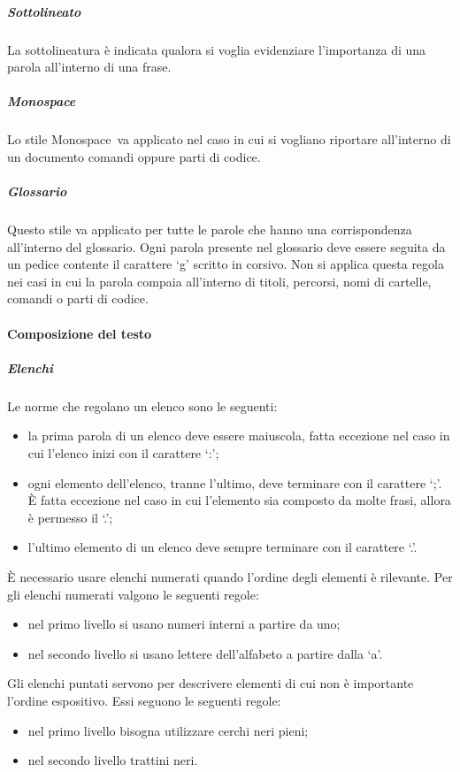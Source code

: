 \documentclass[../NormeProgetto.tex]{subfiles}
\begin{document}
			\subparagraph{Sottolineato}
				La sottolineatura è indicata qualora si voglia evidenziare l'importanza di una parola all'interno di una frase.					
			
			\subparagraph{Monospace}
				Lo stile Monospace\g\ va applicato nel caso in cui si vogliano riportare all'interno di un documento	comandi oppure parti di codice.
			
			\subparagraph{Glossario}\label{sec:Formattazione termini nel glossario}
				Questo stile va applicato per tutte le parole che hanno una corrispondenza all'interno del glossario. Ogni parola presente nel glossario deve essere seguita da un pedice contente il carattere `g' scritto in corsivo. Non si applica questa regola nei casi in cui la parola compaia all'interno di titoli, percorsi, nomi di cartelle, comandi o parti di codice.
			
		\paragraph{Composizione del testo}
			\subparagraph{Elenchi}
				Le norme che regolano un elenco sono le seguenti:
				\begin{itemize}
					\item la prima parola di un elenco deve essere maiuscola, fatta eccezione nel caso in cui l'elenco inizi con il carattere `:';
					\item ogni elemento dell'elenco, tranne l'ultimo, deve terminare con il carattere `;'. È fatta eccezione nel caso in cui l'elemento sia composto da molte frasi, allora è permesso il `.';
					\item l'ultimo elemento di un elenco deve sempre terminare con il carattere `.'.
				\end{itemize}
				È necessario usare elenchi numerati quando l'ordine degli elementi è rilevante. Per gli elenchi numerati valgono le seguenti regole:
				\begin{itemize}
					\item nel primo livello si usano numeri interni a partire da uno;
					\item nel secondo livello si usano lettere dell'alfabeto a partire dalla `a'.
				\end{itemize}
				Gli elenchi puntati servono per descrivere elementi di cui non è importante l'ordine espositivo. Essi seguono le seguenti regole:
				\begin{itemize}
					\item nel primo livello bisogna utilizzare cerchi neri pieni;
					\item nel secondo livello trattini neri.
				\end{itemize}
			
\end{document}
